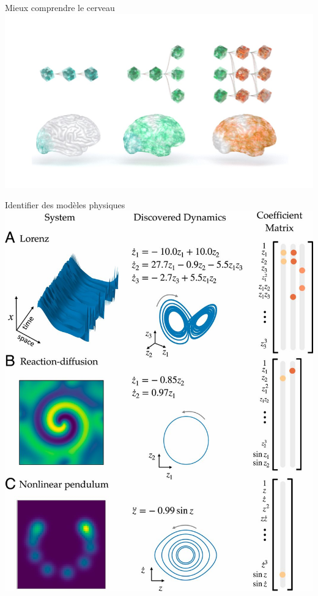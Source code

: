 \documentclass[aspectratio=169, usenames, dvipsnames]{beamer}
\begin{document}
{
  
  \begin{frame}[t, c]{Mieux comprendre le cerveau}{}
    \vfill
    \centering
    \includegraphics[width=\textwidth]{meta_brain}
    \vfill
  \end{frame}

\begin{frame}[t, c]{Identifier des modèles physiques}{}
  \centering
  \includegraphics[height=.8\textheight]{sindy}
\end{frame}

}
\end{document}
